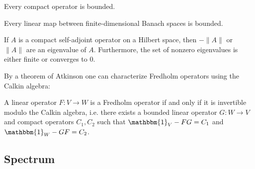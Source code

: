     \begin{property}
        Every compact operator is bounded.
    \end{property}
    \begin{result}
        Every linear map between finite-dimensional Banach spaces is bounded.
    \end{result}

    \begin{property}
        If $A$ is a compact self-adjoint operator on a Hilbert space, then $-\|A\|$ or $\|A\|$ are an eigenvalue of $A$. Furthermore, the set of nonzero eigenvalues is either finite or converges to 0.
    \end{property}



    By a theorem of Atkinson one can characterize Fredholm operators using the Calkin algebra:
    \begin{property}[Atkinson]
        A linear operator $F:V\rightarrow W$ is a Fredholm operator if and only if it is invertible modulo the Calkin algebra, i.e. there exists a bounded linear operator $G:W\rightarrow V$ and compact operators $C_1,C_2$ such that $\mathbbm{1}_V-FG=C_1$ and $\mathbbm{1}_W-GF=C_2$.
    \end{property}


\subsection{Spectrum}\label{section:spectrum}


